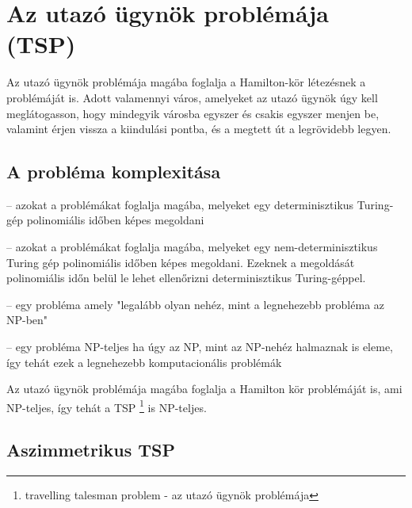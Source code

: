 \chapter{Az utazó ügynök problémája (TSP)}\label{ch:ALAP}


Az utazó ügynök problémája magába foglalja a Hamilton-kör létezésnek a problémáját is. Adott valamennyi város, amelyeket az utazó ügynök úgy kell meglátogasson, hogy mindegyik városba egyszer és csakis egyszer menjen be, valamint érjen vissza a kiindulási pontba, és a megtett út a legrövidebb legyen.

\section{A probléma komplexitása}\label{sec:ALAP:adatelem}

\begin{description}
	\setlength{\itemsep}{0.04mm}
	\item[P] -- azokat a problémákat foglalja magába, melyeket egy determinisztikus Turing-gép polinomiális időben képes megoldani
	\item[NP] -- azokat a problémákat foglalja magába, melyeket egy nem-determinisztikus Turing gép polinomiális időben képes megoldani. Ezeknek a megoldását polinomiális időn belül le lehet ellenőrizni determinisztikus Turing-géppel.
	\item[NP-nehéz] -- egy probléma amely "legalább olyan nehéz, mint a legnehezebb probléma az NP-ben"
	\item[NP-teljes] -- egy probléma NP-teljes ha úgy az NP, mint az NP-nehéz halmaznak is eleme, így tehát ezek a legnehezebb komputacionális problémák
\end{description}


Az utazó ügynök problémája magába foglalja a Hamilton kör problémáját is, ami NP-teljes, így tehát a TSP%
\footnote{ %
	travelling talesman problem - az utazó ügynök problémája
}  %
 is NP-teljes.

\section{Aszimmetrikus TSP}\label{sec:ALAP:adatelem}

